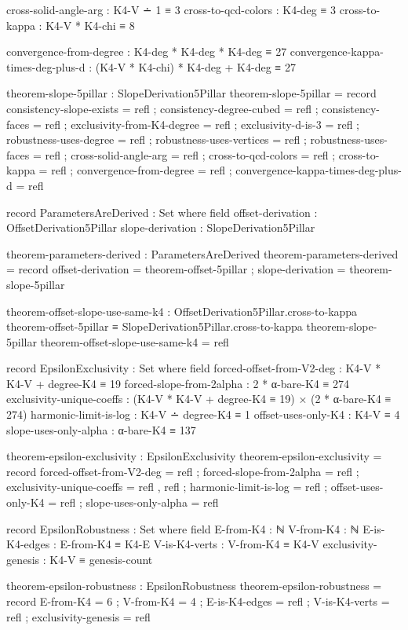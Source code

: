 \documentclass[11pt,a4paper]{book}
\begin{document}
\begin{code}
    cross-solid-angle-arg : K4-V ∸ 1 ≡ 3
    cross-to-qcd-colors : K4-deg ≡ 3
    cross-to-kappa : K4-V * K4-chi ≡ 8
    
    convergence-from-degree : K4-deg * K4-deg * K4-deg ≡ 27
    convergence-kappa-times-deg-plus-d : (K4-V * K4-chi) * K4-deg + K4-deg ≡ 27

theorem-slope-5pillar : SlopeDerivation5Pillar
theorem-slope-5pillar = record
  { consistency-slope-exists = refl
  ; consistency-degree-cubed = refl
  ; consistency-faces = refl
  ; exclusivity-from-K4-degree = refl
  ; exclusivity-d-is-3 = refl
  ; robustness-uses-degree = refl
  ; robustness-uses-vertices = refl
  ; robustness-uses-faces = refl
  ; cross-solid-angle-arg = refl
  ; cross-to-qcd-colors = refl
  ; cross-to-kappa = refl
  ; convergence-from-degree = refl
  ; convergence-kappa-times-deg-plus-d = refl
  }

record ParametersAreDerived : Set where
  field
    offset-derivation : OffsetDerivation5Pillar
    slope-derivation : SlopeDerivation5Pillar

theorem-parameters-derived : ParametersAreDerived
theorem-parameters-derived = record
  { offset-derivation = theorem-offset-5pillar
  ; slope-derivation = theorem-slope-5pillar
  }

theorem-offset-slope-use-same-k4 : 
  OffsetDerivation5Pillar.cross-to-kappa theorem-offset-5pillar ≡ 
  SlopeDerivation5Pillar.cross-to-kappa theorem-slope-5pillar
theorem-offset-slope-use-same-k4 = refl

record EpsilonExclusivity : Set where
  field
    forced-offset-from-V2-deg  : K4-V * K4-V + degree-K4 ≡ 19
    forced-slope-from-2alpha   : 2 * α-bare-K4 ≡ 274
    exclusivity-unique-coeffs  : (K4-V * K4-V + degree-K4 ≡ 19) × (2 * α-bare-K4 ≡ 274)
    harmonic-limit-is-log      : K4-V ∸ degree-K4 ≡ 1
    offset-uses-only-K4        : K4-V ≡ 4
    slope-uses-only-alpha      : α-bare-K4 ≡ 137

theorem-epsilon-exclusivity : EpsilonExclusivity
theorem-epsilon-exclusivity = record
  { forced-offset-from-V2-deg = refl
  ; forced-slope-from-2alpha = refl
  ; exclusivity-unique-coeffs = refl , refl
  ; harmonic-limit-is-log = refl
  ; offset-uses-only-K4 = refl
  ; slope-uses-only-alpha = refl
  }

record EpsilonRobustness : Set where
  field
    E-from-K4     : ℕ
    V-from-K4     : ℕ
    E-is-K4-edges : E-from-K4 ≡ K4-E
    V-is-K4-verts : V-from-K4 ≡ K4-V
    exclusivity-genesis : K4-V ≡ genesis-count

theorem-epsilon-robustness : EpsilonRobustness
theorem-epsilon-robustness = record
  { E-from-K4 = 6
  ; V-from-K4 = 4
  ; E-is-K4-edges = refl
  ; V-is-K4-verts = refl
  ; exclusivity-genesis = refl
  }


\end{code}
\end{document}
